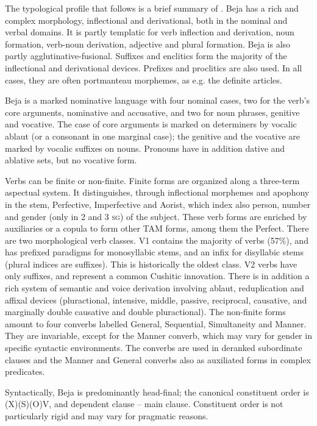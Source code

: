 \documentclass[output=paper,colorlinks,citecolor=brown]{langscibook}
\begin{document}
The typological profile that follows is a brief summary of \citet{Vanhove2017}. Beja has a rich and complex morphology, inflectional and derivational, both in the nominal and verbal domains. It is partly templatic for verb inflection and derivation, noun formation, verb-noun derivation, adjective and plural formation. Beja is also partly agglutinative-fusional. Suffixes and enclitics form the majority of the inflectional and derivational devices. Prefixes and proclitics are also used. In all cases, they are often portmanteau morphemes, as e.g. the definite articles.

Beja is a marked nominative language with four nominal cases, two for the verb's core arguments, nominative and accusative, and two for noun phrases, genitive and vocative. The case of core arguments is marked on determiners by vocalic ablaut (or a consonant in one marginal case); the genitive and the vocative are marked by vocalic suffixes on nouns. Pronouns have in addition dative and ablative sets, but no vocative form.

Verbs can be finite or non-finite. Finite forms are organized along a three-term aspectual system. It distinguishes, through inflectional morphemes and apophony in the stem, Perfective, Imperfective and Aorist, which index also person, number and gender (only in 2 and 3 \textsc{sg}) of the subject. These verb forms are enriched by auxiliaries or a copula to form other TAM forms, among them the Perfect. There are two morphological verb classes. V1 contains the majority of verbs (57\%), and has prefixed paradigms for monosyllabic stems, and an infix for disyllabic stems (plural indices are suffixes). This is historically the oldest class. V2 verbs have only suffixes, and represent a common Cushitic innovation. There is in addition a rich system of semantic and voice derivation involving ablaut, reduplication and affixal devices (pluractional, intensive, middle, passive, reciprocal, causative, and marginally double causative and double pluractional). The non-finite forms amount to four converbs labelled General, Sequential, Simultaneity and Manner. They are invariable, except for the Manner converb, which may vary for gender in specific syntactic environments. The converbs are used in deranked subordinate clauses and the Manner and General converbs also as auxiliated forms in complex predicates.

Syntactically, Beja is predominantly head-final; the canonical constituent order is (X)(S)(O)V, and dependent clause – main clause. Constituent order is not particularly rigid and may vary for pragmatic reasons.
\end{document}
